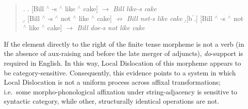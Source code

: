 \singlespacing
\begin{quote}
\begin{minipage}{5.5in}
\ex. \label{En_LD_neg_tense}
\a. [Bill $^{\wedge}$ -s $^{\wedge}$ like $^{\wedge}$ cake] $\rightarrow$ \textit{Bill like-s cake}\\
\b. [Bill $^{\wedge}$ -s $^{\wedge}$ not $^{\wedge}$ like $^{\wedge}$ cake] $\not\rightarrow$ \textit{Bill not-s like cake}
\b.[b$^{\prime}$.] [Bill $^{\wedge}$ -s $^{\wedge}$ not $^{\wedge}$ like $^{\wedge}$ cake] $\rightarrow$ \textit{Bill doe-s not like cake}

\end{minipage}
\end{quote}
\onehalfspacing
If the element directly to the right of the finite tense morpheme is not a verb (in the absence of aux-raising and before the late merger of adjuncts), {\it do}-support is required in English. In this way, Local Dislocation of this morpheme appears to be category-sensitive. Consequently, this evidence points to a system in which Local Dislocation is not a uniform process across affixal transformations; i.e.\ some morpho-phonological affixation under string-adjacency is sensitive to syntactic category, while other, structurally identical operations are not.

